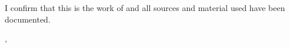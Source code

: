 \thispagestyle{empty}
\vspace*{0.8\textheight}
\noindent
I confirm that this \MakeLowercase{\getDoctype{}} is the work of \MakeLowercase{\getLabGroup{}} and all sources and material used have been documented.

\vspace{15mm}
\noindent
\getSubmissionLocation{}, \getSubmissionDate{} \hspace{50mm} \getAuthor{}

\cleardoublepage{}